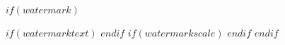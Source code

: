$if(watermark)$
\usepackage{draftwatermark}
$if(watermarktext)$
$endif$
$if(watermarkscale)$
$endif$
$endif$
